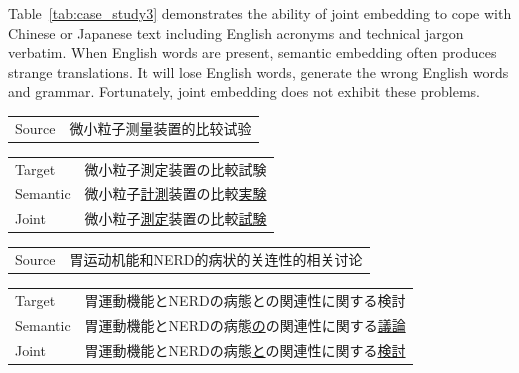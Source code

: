 \begin{CJK}{UTF8}{ipxm}
Table~\ref{tab:case_study3} demonstrates the ability of joint embedding to cope with Chinese or Japanese text including English acronyms and technical jargon verbatim.  When English words are present, semantic embedding often produces strange translations.
It will lose English words, generate the wrong English words and grammar.  Fortunately, joint embedding does not exhibit these problems.

\end{CJK}

\begin{table}[h]
    \centering

    \begin{CJK}{UTF8}{gbsn}
        \begin{tabularx}{\textwidth}{p{1.2cm}b}\toprule
            Source & 微小粒子测量装置的比较试验 \\
        \end{tabularx}
    \end{CJK}

    \begin{CJK}{UTF8}{ipxm}
        \begin{tabularx}{\textwidth}{p{1.2cm}b}
            Target & 微小粒子測定装置の比較試験 \\
            Semantic & 微小粒子\underline{計測}装置の比較\underline{実験} \\
            Joint & 微小粒子\underline{測定}装置の比較\underline{試験} \\\midrule
        \end{tabularx}
    \end{CJK}

    \begin{CJK}{UTF8}{gbsn}
        \begin{tabularx}{\textwidth}{p{1.2cm}b}
            Source & 胃运动机能和NERD的病状的关连性的相关讨论 \\
        \end{tabularx}
    \end{CJK}

    \begin{CJK}{UTF8}{ipxm}
        \begin{tabularx}{\textwidth}{p{1.2cm}b}
            Target & 胃運動機能とNERDの病態との関連性に関する検討 \\
            Semantic & 胃運動機能とNERDの病態\underline{の}の関連性に関する\underline{議論} \\
            Joint & 胃運動機能とNERDの病態\underline{と}の関連性に関する\underline{検討} \\\midrule
        \end{tabularx}
    \end{CJK}


\end{table}
